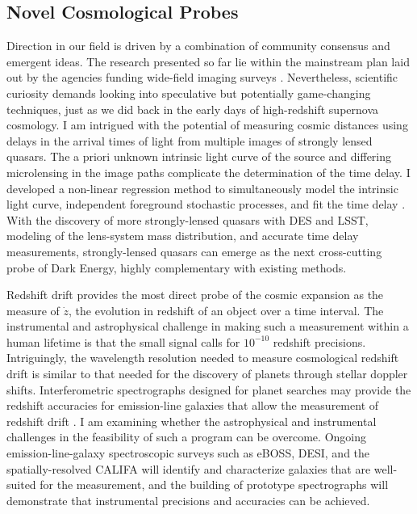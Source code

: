 \documentclass{article}
\begin{document}
\subsection{Novel Cosmological Probes}
Direction in our field is driven by a combination of community consensus and emergent ideas.
The research presented so far  lie  within the
mainstream plan laid out by the agencies funding wide-field imaging surveys
\cite{2013arXiv1309.5386D,2013arXiv1309.5382K}.
Nevertheless, scientific curiosity demands looking into speculative but potentially game-changing
techniques, just as we did back in the early days of high-redshift supernova cosmology.
I am intrigued with the potential of measuring cosmic distances using delays in the arrival times of light from multiple images
of strongly lensed quasars.  The a priori unknown intrinsic light curve of the source and differing microlensing
in the image paths complicate the determination of the time delay.  I developed a
non-linear regression method to simultaneously model the intrinsic light curve, independent foreground
stochastic processes, and fit the time delay \cite{2013PhRvD..87l3512H}.  With the discovery of more 
strongly-lensed quasars with DES and LSST, modeling of the lens-system mass distribution, and accurate
time delay measurements, strongly-lensed
quasars can emerge as the next cross-cutting probe of Dark Energy, highly complementary with existing methods.

Redshift drift provides the most direct  probe
of the cosmic expansion as the measure of $\dot{z}$, the evolution in redshift of an object over a time interval.
The instrumental
and astrophysical challenge
in making such a measurement within a human lifetime
is that the small signal calls for $10^{-10}$ redshift precisions.  Intriguingly, the wavelength resolution needed to measure
cosmological redshift drift is similar to that needed for the discovery of planets through stellar doppler shifts.
Interferometric spectrographs designed for planet searches may provide the redshift accuracies for emission-line galaxies
that allow the measurement of redshift drift
\cite{drift}.
I  am examining whether the astrophysical and instrumental challenges in the feasibility of such a program can be overcome.
Ongoing  emission-line-galaxy  spectroscopic surveys such
as eBOSS, DESI, and the spatially-resolved CALIFA will identify and characterize
galaxies that are well-suited for the measurement, and the building of prototype spectrographs will demonstrate that
instrumental precisions and accuracies can be achieved.
\end{document}
